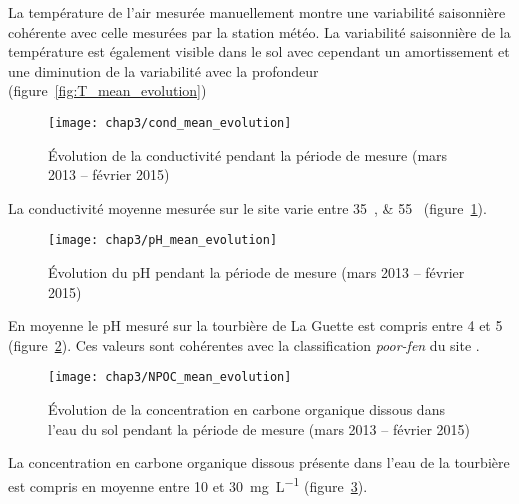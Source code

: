 La température de l'air mesurée manuellement montre une variabilité saisonnière cohérente avec celle mesurées par la station météo. 
La variabilité saisonnière de la température est également visible dans le sol avec cependant un amortissement et une diminution de la variabilité avec la profondeur (figure~\ref{fig:T_mean_evolution})

\begin{figure}
\centering
\texttt{[image: chap3/cond\_mean\_evolution]}
\caption{Évolution de la conductivité pendant la période de mesure (mars 2013 -- février 2015)}
\label{fig:cond_mean_evolution}
\end{figure}

La conductivité moyenne mesurée sur le site varie entre \SIlist{35;55}{\usml} (figure~\ref{fig:cond_mean_evolution}).


\begin{figure}
\centering
\texttt{[image: chap3/pH\_mean\_evolution]}
\caption{Évolution du pH pendant la période de mesure (mars 2013 -- février 2015)}
\label{fig:pH_mean_evolution}
\end{figure}


En moyenne le pH mesuré sur la tourbière de La Guette est compris entre 4 et 5 (figure~\ref{fig:pH_mean_evolution}).
Ces valeurs sont cohérentes avec la classification \textit{poor-fen} du site .



\begin{figure}
\centering
\texttt{[image: chap3/NPOC\_mean\_evolution]}
\caption{Évolution de la concentration en carbone organique dissous dans l'eau du sol pendant la période de mesure (mars 2013 -- février 2015)}
\label{fig:NPOC_mean_evolution}
\end{figure}

La concentration en carbone organique dissous présente dans l'eau de la tourbière est compris en moyenne entre \num{10} et \SI{30}{\milli\gram\per\liter} (figure~\ref{fig:NPOC_mean_evolution}).


